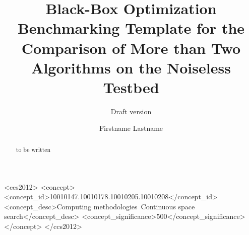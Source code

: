 \documentclass[sigconf]{acmart}
\begin{document}
\title{Black-Box Optimization Benchmarking Template for the Comparison of More than Two Algorithms on the Noiseless Testbed}
\renewcommand{\shorttitle}{Black-Box Optimization Benchmarking Template for More Than Two Algorithms}
\subtitle{Draft version}



\author{Firstname Lastname}
%
%
%
%
%
%
%

\renewcommand{\shortauthors}{Firstname Lastname et. al.}


\begin{abstract}
to be written
\end{abstract}


%
%
 \begin{CCSXML}
<ccs2012>
<concept>
<concept_id>10010147.10010178.10010205.10010208</concept_id>
<concept_desc>Computing methodologies~Continuous space search</concept_desc>
<concept_significance>500</concept_significance>
</concept>
</ccs2012>
\end{CCSXML}
\end{document}
